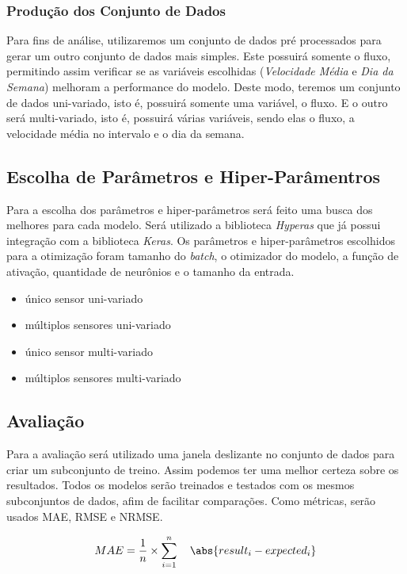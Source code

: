 \documentclass[conference]{IEEEtran}
\begin{document}
\subsubsection{Produção dos Conjunto de Dados}

Para fins de análise, utilizaremos um conjunto de dados pré processados para gerar um outro conjunto de dados mais simples. Este possuirá somente o fluxo, permitindo assim verificar se as variáveis escolhidas (\textit{Velocidade Média} e \textit{Dia da Semana}) melhoram a performance do modelo. Deste modo, teremos um conjunto de dados uni-variado, isto é, possuirá somente uma variável, o fluxo. E o outro será multi-variado, isto é, possuirá várias variáveis, sendo elas o fluxo, a velocidade média no intervalo e o dia da semana.

\subsection{Escolha de Parâmetros e Hiper-Parâmentros}

Para a escolha dos parâmetros e hiper-parâmetros será feito uma busca dos melhores para cada modelo. Será utilizado a biblioteca \textit{Hyperas} que já possui integração com a biblioteca \textit{Keras}. Os parâmetros e hiper-parâmetros escolhidos para a otimização foram tamanho do \textit{batch}, o otimizador do modelo, a função de ativação, quantidade de neurônios e o tamanho da entrada. 

\begin{itemize}
    \item único sensor uni-variado
    \item múltiplos sensores uni-variado
    \item único sensor multi-variado
    \item múltiplos sensores multi-variado
\end{itemize}

\subsection{Avaliação}

Para a avaliação será utilizado uma janela deslizante no conjunto de dados para criar um subconjunto de treino. Assim podemos ter uma melhor certeza sobre os resultados. Todos os modelos serão treinados e testados com os mesmos subconjuntos de dados, afim de facilitar comparações. Como métricas, serão usados MAE, RMSE e NRMSE. 

\begin{equation}
MAE = \frac{1}{n} \times \sum_{i=1}^{n} \quad \abs{result_i - expected_i}
\end{equation}
\end{document}
